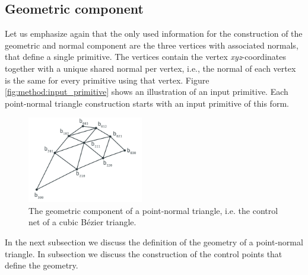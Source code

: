 
\subsection{Geometric component}
\label{ss:geometric_component}
Let us emphasize again that the only used information for the construction of the geometric and normal component are the three vertices with associated normals, that define a single primitive. The vertices contain the vertex \textit{xyz}-coordinates together with a unique shared normal per vertex, i.e., the normal of each vertex is the same for every primitive using that vertex. Figure \ref{fig:method:input_primitive} shows an illustration of an input primitive. Each point-normal triangle construction starts with an input primitive of this form.

\begin{figure}
	\centering
	\includegraphics[width=0.45\textwidth]{./content/img/method/geometry.png}
	\caption{The geometric component of a point-normal triangle, i.e. the control net of a cubic Bézier triangle.}
	\label{fig:method:control_net}
\end{figure}
%
%
In the next subsection we discuss the definition of the geometry of a point-normal triangle. In subsection  we discuss the construction of the control points that define the geometry. 

